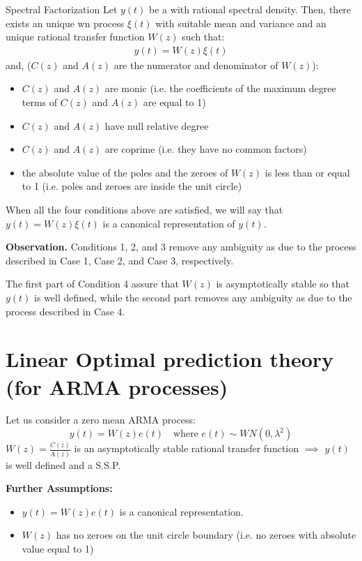 
\begin{theorem}{Spectral Factorization}
	Let $y(t)$ be a \ssp with rational spectral density. 
	Then, there exists an unique \gls{wn} process $\xi(t)$ with suitable mean and variance and an unique rational transfer function $W(z)$ such that:
	\begin{align*}
		y(t) = W(z)\xi(t)
	\end{align*}
    and, ($C(z)$ and $A(z)$ are the numerator and denominator of $W(z)$):
    \begin{itemize}
		\item $C(z)$ and $A(z)$ are monic (i.e. the coefficients of the maximum degree terms of $C(z)$ and $A(z)$ are equal to 1)
		\item $C(z)$ and $A(z)$ have null relative degree
		\item $C(z)$ and $A(z)$ are coprime (i.e. they have no common factors) 
		\item the absolute value of the poles and the zeroes of $W(z)$ is less than or equal to 1 (i.e. poles and zeroes are inside the unit circle)
    \end{itemize}
\end{theorem}

When all the four conditions above are satisfied, we will say that $y(t) = W(z)\xi(t)$ is a canonical representation of $y(t)$.

\textbf{Observation.} Conditions 1, 2, and 3 remove any ambiguity as due to the process described in Case 1, Case 2, and Case 3, respectively. 

The first part of Condition 4 assure that $W(z)$ is asymptotically stable so that $y(t)$ is well defined, while the second part removes any ambiguity as due to the process described in Case 4.


\section{Linear Optimal prediction theory (for ARMA processes) }
Let us consider a zero mean ARMA process:
\[
	y(t)=W(z)e(t) \quad \text{where }e(t)\sim W N(0,\lambda^{2} )
\]
$W(z)=\frac{C(z)}{A(z)}$ is an asymptotically stable rational transfer function $\implies$ $y(t)$ is well defined and a S.S.P.

\textbf{Further Assumptions:}
\begin{itemize}
	\item $y(t) =W(z)e(t)$ is a canonical representation.
	\item $W(z)$ has no zeroes on the unit circle boundary (i.e. no zeroes with absolute value equal to 1)
\end{itemize}
 

